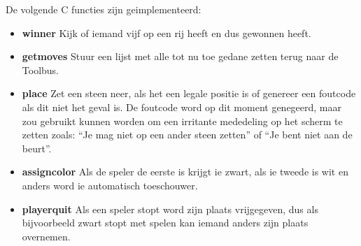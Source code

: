 De volgende C functies zijn geimplementeerd:
\begin{itemize}
\item{\bf winner} Kijk of iemand vijf op een rij heeft en dus gewonnen heeft.
\item{\bf getmoves} Stuur een lijst met alle tot nu toe gedane zetten terug
naar de Toolbus.
\item{\bf place} Zet een steen neer, als het een legale positie is of
genereer een foutcode als dit niet het geval is. De foutcode word op dit
moment genegeerd, maar zou gebruikt kunnen worden om een irritante
mededeling op het scherm te zetten zoals: ``Je mag niet op een ander
steen zetten'' of ``Je bent niet aan de beurt''.
\item{\bf assigncolor} Als de speler de eerste is krijgt ie zwart, als ie
tweede is wit en anders word ie automatisch toeschouwer.
\item{\bf playerquit} Als een speler stopt word zijn plaats vrijgegeven,
dus als bijvoorbeeld zwart stopt met spelen kan iemand anders zijn
plaats overnemen.
\end{itemize}

